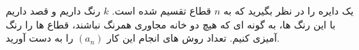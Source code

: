 \exercise
یک دایره را در نظر بگیرید که به 
$n$
قطاع تقسیم شده است. 
$k$
 رنگ داریم و قصد داریم با این رنگ ها، به گونه ای که هیچ دو خانه مجاوری همرنگ نباشند، قطاع ها را رنگ آمیزی کنیم. تعداد روش های انجام این کار
$(a_n)$
  را به دست آورید.